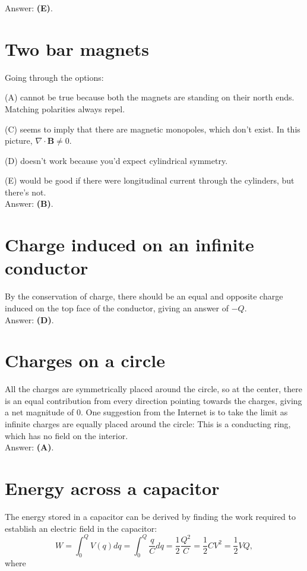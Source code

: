 \documentclass[11pt]{paper}
\newcommand{\answer}[1]{Answer: \textbf{(#1)}.}
\begin{document}
\answer{E}

\section{Two bar magnets}
Going through the options:

(A) cannot be true because both the magnets are standing on their north ends.  Matching polarities always repel.

(C) seems to imply that there are magnetic monopoles, which don't exist.  In this picture, $\nabla \cdot \mathbf{B} \neq 0$.

(D) doesn't work because you'd expect cylindrical symmetry.

(E) would be good if there were longitudinal current through the cylinders, but there's not.\\

\answer{B}

\section{Charge induced on an infinite conductor}
By the conservation of charge, there should be an equal and opposite charge induced on the top face of the conductor, giving an answer of $-Q$.\\

\answer{D}

\section{Charges on a circle}
All the charges are symmetrically placed around the circle, so at the center, there is an equal contribution from every direction pointing towards the charges, giving a net magnitude of 0.  One suggestion from the Internet is to take the limit as infinite charges are equally placed around the circle:  This is a conducting ring, which has no field on the interior.\\

\answer{A}

\section{Energy across a capacitor}
The energy stored in a capacitor can be derived by finding the work required to establish an electric field in the capacitor:
\begin{equation}
W = \int_0^Q V(q) dq = \int_0^Q \frac{q}{C} dq = \frac{1}{2} \frac{Q^2}{C} = \frac{1}{2} CV^2 = \frac{1}{2} V Q,
\end{equation}
where
\end{document}
